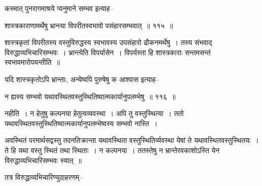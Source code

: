 \documentclass[article,12pt,a4paper]{memoir}
\begin{document}
	  \pstart कस्मात् पुनरागमाश्रये प्यनुमाने सम्भव इत्याह--
	\pend
        
	  \bigskip
	  \begingroup
	

	  \pstart शास्त्रकाराणामर्थेषु भ्रान्त्या विपरीतस्वभावो पसंहारसम्भवात् ॥ ११५ ॥
	\pend
      
	  \endgroup
	 

	  \pstart शास्त्रकृतां विपरीतस्य वस्तुविरुद्धस्य स्वभावस्य उपसंहारो ढौकनमर्थेषु । तस्य संभवाद् विरुद्धाव्यभिचारिसम्भवः । भ्रान्त्येति विपर्यासेन । विपर्यस्ता हि शास्त्रकाराः सन्तमसन्तं स्वभावमारोपयन्तीति ॥
	\pend
        

	  \pstart यदि शास्त्रकृतोऽपि भ्रान्ताः, अन्येष्वपि पुरुषेषु क आश्वास इत्याह--
	\pend
        
	  \bigskip
	  \begingroup
	

	  \pstart न ह्यस्य सम्भवो यथावस्थितवस्तुस्थितिष्वात्मकार्यानुपलम्भेषु ॥ ११६ ॥
	\pend
      
	  \endgroup
	 

	  \pstart नहीति । न हेतुषु कल्पनया हेतुत्वव्यवस्था । अपि तु वस्तुस्थित्या । ततो यथावस्थितवस्तुस्थितिष्वात्मकार्यानुपलम्भेष्वस्य सम्भवो नास्ति ।
	\pend
        

	  \pstart अवस्थितं परमार्थसद्वस्तु तदनतिक्रान्ता यथावस्थिता वस्तुस्थितिर्व्यवस्था येषां ते यथावस्थितवस्तुस्थितयः । ते हि यथा वस्तु स्थितं तथा स्थिताः । न कल्पनया । ततस्तेषु न भ्रान्तेरवकाशोऽस्ति येन विरुद्धाव्यभिचारिसम्भवः स्यात् ॥
	\pend
        

	  \pstart तत्र विरुद्धाव्यभिचारिण्युदाहरणम्--
	\pend
      
	  \endgroup
	
\end{document}
